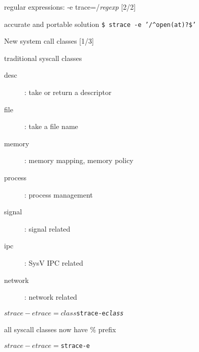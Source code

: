 \documentclass[unicode]{beamer}
\begin{document}
\begin{frame}[fragile]{regular expressions: -e trace=/\textit{regexp} \hfill [2/2]}

\begin{block}{accurate and portable solution}
\texttt{\$ strace -e '/{\textasciicircum}open(at)?\$'}
\end{block}
\end{frame}

\begin{frame}[fragile]{New system call classes \hfill [1/3]}
\begin{block}{\large traditional syscall classes}
\begin{description}
	\item[desc]: take or return a descriptor
	\item[file]: take a file name
	\item[memory]: memory mapping, memory policy
	\item[process]: process management
	\item[signal]: signal related
	\item[ipc]: SysV IPC related
	\item[network]: network related
\end{description}
\begin{alltt}
$ strace -e trace=\textit{class}
$ strace -e \textit{class}
\end{alltt}
\end{block}

\begin{block}{\large all syscall classes now have \% prefix}
\begin{alltt}
$ strace -e trace=%\textit{class}
$ strace -e %\textit{class}
\end{alltt}
\end{block}
\end{frame}
\end{document}
